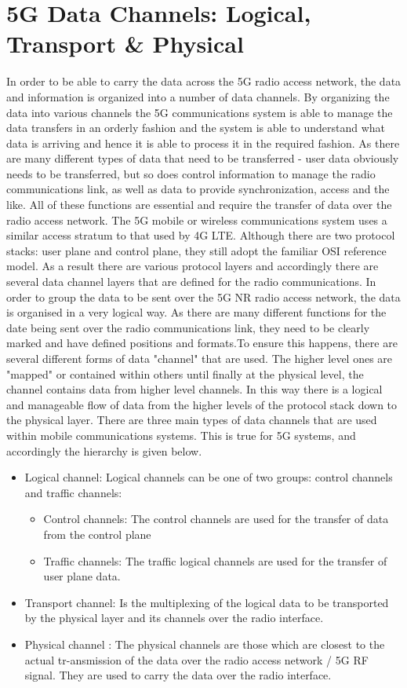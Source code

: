 \section{5G Data Channels: Logical, Transport \& Physical}

In order to be able to carry the data across the 5G radio access network, the data and information is organized into a number of data channels.
By organizing the data into various channels the 5G communications system is able to manage the data transfers in an orderly fashion and the system is able to understand what data is arriving and hence it is able to process it in the required fashion.
As there are many different types of data that need to be transferred - user data obviously needs to be transferred, but so does control information to manage the radio communications link, as well as data to provide synchronization, access and the like. All of these functions are essential and require the transfer of data over the radio access network. The 5G mobile or wireless communications system uses a similar access stratum to that used by 4G LTE.
Although there are two protocol stacks: user plane and control plane, they still adopt the familiar OSI reference model.
As a result there are various protocol layers and accordingly there are several data channel layers that are defined for the radio communications.
In order to group the data to be sent over the 5G NR radio access network, the data is organised in a very logical way. As there are many different functions for the date being sent over the radio communications link, they need to be clearly marked and have defined positions and formats.To ensure this happens, there are several different forms of data "channel" that are used. The higher level ones are "mapped" or contained within others until finally at the physical level, the channel contains data from higher level channels.
In this way there is a logical and manageable flow of data from the higher levels of the protocol stack down to the physical layer.
There are three main types of data channels that are used within mobile communications systems. This is true for 5G systems, and accordingly the hierarchy is given below.
\begin{itemize}
    \item Logical channel: Logical channels can be one of two groups: control channels and traffic channels:
    \begin{itemize}
        \item Control channels: The control channels are used for the transfer of data from the control plane
        \item Traffic channels: The traffic logical channels are used for the transfer of user plane data.
    \end{itemize}
    \item Transport channel: Is the multiplexing of the logical data to be transported by the physical layer and its channels over the radio interface.
    \item Physical channel : The physical channels are those which are closest to the actual tr-ansmission of the data over the radio access network / 5G RF signal. They are used to carry the data over the radio interface.
\end{itemize}
